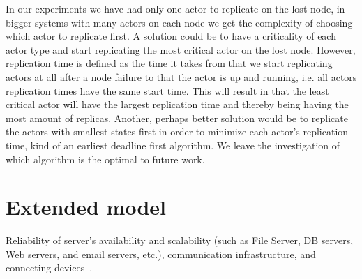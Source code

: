 \documentclass{cslthse-msc}
\begin{document}
In our experiments we have had only one actor to replicate on the lost node, in bigger systems with many actors on each node we get the complexity of choosing which actor to replicate first. A solution could be to have a criticality of each actor type and start replicating the most critical actor on the lost node. However, replication time is defined as the time it takes from that we start replicating actors at all after a node failure to that the actor is up and running, i.e. all actors replication times have the same start time. This will result in that the least critical actor will have the largest replication time and thereby being having the most amount of replicas. %
Another, perhaps better solution would be to replicate the actors with smallest states first in order to minimize each actor's replication time, kind of an earliest deadline first algorithm. We leave the investigation of which algorithm is the optimal to future work.

\section{Extended model} \label{subsec:future_extended_model}
Reliability of server’s availability and scalability (such as File Server, DB servers, Web servers, and email servers, etc.), communication infrastructure, and connecting devices~\cite{surveyReliabilityDistr}.
\end{document}
